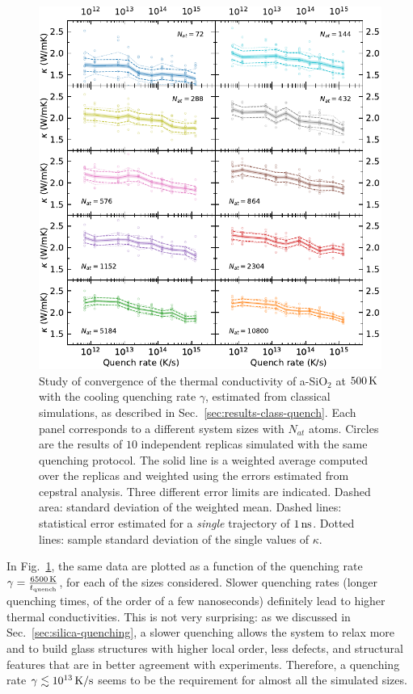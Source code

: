 \begin{figure}[!tb]
    \centering
    \includegraphics[width=\textwidth]{chapters/chapter6/figures/Silica_NVT_kappa_QTIMEconv.pdf}
    \caption{Study of convergence of the thermal conductivity of a-SiO$_2$ at $500\,\mathrm{K}$ with the cooling quenching rate $\gamma$, estimated from classical simulations, as described in Sec.~\ref{sec:results-class-quench}. 
    Each panel corresponds to a different system sizes with $N_{at}$ atoms.
    Circles are the results of $10$ independent replicas simulated with the same quenching protocol. The solid line is a weighted average computed over the replicas and weighted using the errors estimated from cepstral analysis. Three different error limits are indicated. 
    Dashed area: standard deviation of the weighted mean. 
    Dashed lines: statistical error estimated for a \emph{single} trajectory of $1\,\mathrm{ns}$. 
    Dotted lines: sample standard deviation of the single values of $\kappa$. 
    }
    \label{fig:results-class-kappa-vs-quench}
\end{figure}

In Fig.~\ref{fig:results-class-kappa-vs-quench}, the same data are plotted as a function of the quenching rate $\gamma = \frac{6500\,\mathrm{K}}{t_{\mathrm{quench}}}$, for each of the sizes considered. 
Slower quenching rates (longer quenching times, of the order of a few nanoseconds) definitely lead to higher thermal conductivities. 
This is not very surprising: as we discussed in Sec.~\ref{sec:silica-quenching}, a slower quenching allows the system to relax more and to build glass structures with higher local order, less defects, and structural features that are in better agreement with experiments. 
Therefore, a quenching rate $\gamma \lesssim 10^{13}\,\mathrm{K/s}$ seems to be the requirement for almost all the simulated sizes. 

